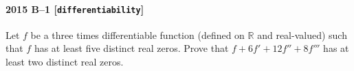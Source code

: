 \paragraph{2015 B--1 \textnormal{[\texttt{differentiability}]}}
Let $f$ be a three times differentiable function (defined on $\mathbb{R}$ and real-valued) such that $f$ has at least five distinct real zeros. Prove that $f + 6f' + 12f'' + 8f'''$ has at least two distinct real zeros.

